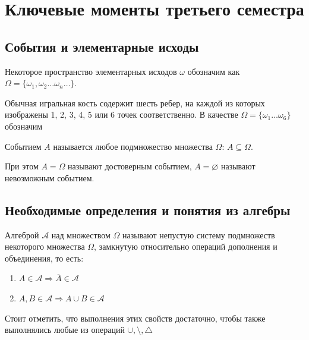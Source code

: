 \section{Ключевые моменты третьего семестра}

\subsection{События и элементарные исходы}

\begin{definition}
    Некоторое пространство элементарных исходов $\omega$ обозначим
    как $\Omega = \{ \omega_1, \omega_2 \dots \omega_n \dots\}$.
\end{definition}

\begin{example}
    Обычная игральная кость содержит шесть ребер, на каждой из которых 
    изображены 1, 2, 3, 4, 5 или 6 точек соответственно. В качестве 
    $\Omega = \{\omega_1 \dots \omega_6\}$ обозначим 
\end{example}

\begin{definition}
    Событием $A$ называется любое подмножество множества $\Omega$: 
    $A \subseteq \Omega$. 

    При этом $A = \Omega$ называют достоверным событием, $A = \varnothing $ называют
    невозможным событием.
\end{definition}

\subsection{Необходимые определения и понятия из алгебры}

\begin{definition}
    Алгеброй $\mathcal{A}$ над множеством $\Omega$ называют непустую систему подмножеств некоторого множества $\Omega$, 
    замкнутую относительно операций дополнения и объединения, то есть:
    \begin{enumerate}
        \item $A \in \mathcal{A} \Rightarrow \overline{A} \in \mathcal{A}$
        \item $A, B \in \mathcal{A} \Rightarrow A \cup B \in \mathcal{A}$
    \end{enumerate}
    Стоит отметить, что выполнения этих свойств достаточно, чтобы также 
    выполнялись любые из операций $\cup, \setminus , \triangle$
\end{definition}

